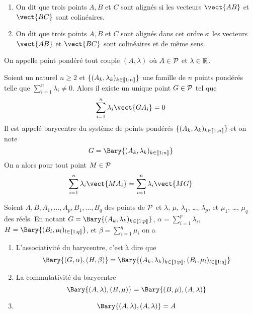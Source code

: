 \begin{defdef}
  \begin{enumerate}
  \item On dit que trois points $A, B$ et $C$ sont alignés si les vecteurs $\vect{AB}$ et $\vect{BC}$ sont colinéaires.
  \item On dit que trois points $A, B$ et $C$ sont alignés dans cet ordre si les vecteurs $\vect{AB}$ et $\vect{BC}$ sont colinéaires et de même sens.
  \end{enumerate}
\end{defdef}

\begin{defdef}
  On appelle point pondéré tout couple $(A,\lambda)$ où $A \in \P$ et $\lambda \in \R$.
\end{defdef}

\begin{prop}
  Soient un naturel $n \geq 2$ et $\{(A_k,\lambda_k)_{k \in \intervalleentier{1}{n}}\}$ une famille de $n$ points pondérés telle que $\sum_{i=1}^n \lambda_i \neq 0$. Alors il existe un unique point $G \in \P$ tel que
\begin{equation}
  \sum_{i=1}^n \lambda_i \vect{GA_i}=0
\end{equation}
Il est appelé barycentre du système de points pondérés $\{(A_k,\lambda_k)_{k \in \intervalleentier{1}{n}}\}$ et on note
\begin{equation}
  G = \Bary\{(A_k,\lambda_k)_{k \in \intervalleentier{1}{n}}\}
\end{equation}
On a alors pour tout point $M \in \P$
\begin{equation}
  \sum_{i=1}^n \lambda_i \vect{MA_i} = \sum_{i=1}^n \lambda_i \vect{MG}
\end{equation}
\end{prop}
\begin{prop}
  Soient $A,B, A_1, \ldots, A_p,B_1, \ldots, B_q$ des points de $\P$ et $\lambda$, $\mu$, $\lambda_1$, \ldots, $\lambda_p$, et $\mu_1$, \ldots, $\mu_q$ des réels. En notant $G = \Bary\{(A_k,\lambda_k)_{k \in \intervalleentier{1}{p}}\}$, $\alpha=\sum_{i=1}^p \lambda_i$, $H = \Bary\{(B_l,\mu_l)_{l \in \intervalleentier{1}{q}}\}$, et $\beta=\sum_{i=1}^q \mu_i$ on a
  \begin{enumerate}
  \item L'associativité du barycentre, c'est à dire que
    \begin{equation}
      \Bary\{(G,\alpha),(H,\beta)\} = \Bary\{(A_k,\lambda_k)_{k \in \intervalleentier{1}{p}}, (B_l,\mu_l)_{l \in \intervalleentier{1}{q}}\}
    \end{equation}
  \item La commutativité du barycentre
    \begin{equation}
      \Bary\{(A,\lambda),(B,\mu)\}=\Bary\{(B,\mu),(A,\lambda)\}
    \end{equation}
  \item
    \begin{equation}
      \Bary\{(A,\lambda),(A,\lambda)\}=A
    \end{equation}
  \end{enumerate}
\end{prop}

